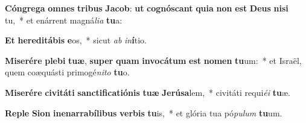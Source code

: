 \item \textbf{Cón}\textbf{gre}\textbf{ga} \textbf{om}\textbf{nes} \textbf{tri}\textbf{bus} \textbf{Ja}\textbf{cob}: \textbf{ut} \textbf{co}\textbf{gnós}\textbf{cant} \textbf{qui}\textbf{a} \textbf{non} \textbf{est} \textbf{De}\textbf{us} \textbf{ni}\textbf{si} tu,~* et enárrent magná\textit{li}\textit{a} \textbf{tu}a:
\item \textbf{Et} \textbf{he}\textbf{re}\textbf{di}\textbf{tá}\textbf{bis} \textbf{e}os,~* sicut \textit{ab} \textit{in}\textbf{í}tio.
\item \textbf{Mi}\textbf{se}\textbf{ré}\textbf{re} \textbf{ple}\textbf{bi} \textbf{tu}\textbf{æ}, \textbf{su}\textbf{per} \textbf{quam} \textbf{in}\textbf{vo}\textbf{cá}\textbf{tum} \textbf{est} \textbf{no}\textbf{men} \textbf{tu}um:~* et Israël, quem coæquásti primogé\textit{ni}\textit{to} \textbf{tu}o.
\item \textbf{Mi}\textbf{se}\textbf{ré}\textbf{re} \textbf{ci}\textbf{vi}\textbf{tá}\textbf{ti} \textbf{sanc}\textbf{ti}\textbf{fi}\textbf{ca}\textbf{ti}\textbf{ó}\textbf{nis} \textbf{tu}\textbf{æ} \textbf{Je}\textbf{rú}\textbf{sa}lem,~* civitáti requi\textit{é}\textit{i} \textbf{tu}æ.
\item \textbf{Re}\textbf{ple} \textbf{Si}\textbf{on} \textbf{in}\textbf{e}\textbf{nar}\textbf{ra}\textbf{bí}\textbf{li}\textbf{bus} \textbf{ver}\textbf{bis} \textbf{tu}is,~* et glória tua pó\textit{pu}\textit{lum} \textbf{tu}um.
